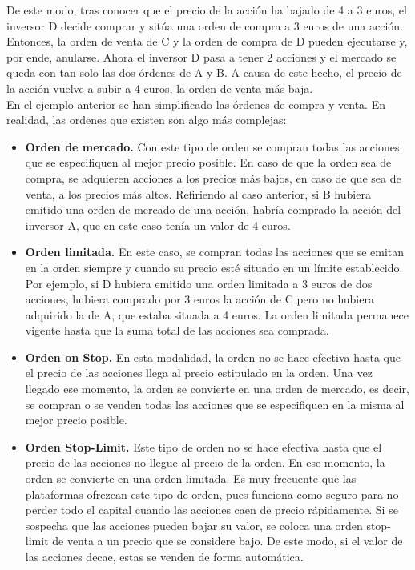 		
		De este modo, tras conocer que el precio de la acci\'on ha bajado de 4 a 3 euros, el inversor D decide comprar y sit\'ua una orden de compra a 3 euros de una acci\'on. Entonces, la orden de venta de C y la orden de compra de D pueden ejecutarse y, por ende, anularse. Ahora el inversor D pasa a tener 2 acciones y el mercado se queda con tan solo las dos \'ordenes de A y B. A causa de este hecho, el precio de la acci\'on vuelve a subir a 4 euros, la orden de venta m\'as baja.\\
		
		En el ejemplo anterior se han simplificado las \'ordenes de compra y venta. En realidad, las ordenes que existen son algo m\'as complejas:\\
		
		\begin{itemize}
			
			\item \textbf{Orden de mercado.} Con este tipo de orden se compran todas las acciones que se especifiquen al mejor precio posible. En caso de que la orden sea de compra, se adquieren acciones a los precios m\'as bajos, en caso de que sea de venta, a los precios m\'as altos. Refiriendo al caso anterior, si B hubiera emitido una orden de mercado de una acci\'on, habría comprado la acci\'on del inversor A, que en este caso ten\'ia un valor de 4 euros.
			
			\item \textbf{Orden limitada.} En este caso, se compran todas las acciones que se emitan en la orden siempre y cuando su precio est\'e situado en un l\'imite establecido. Por ejemplo, si D hubiera emitido una orden limitada a 3 euros de dos acciones, hubiera comprado por 3 euros la acci\'on de C pero no hubiera adquirido la de A, que estaba situada a 4 euros. La orden limitada permanece vigente hasta que la suma total de las acciones sea comprada.
			
			\item \textbf{Orden on Stop.} En esta modalidad, la orden no se hace efectiva hasta que el precio de las acciones llega al precio estipulado en la orden. Una vez llegado ese momento, la orden se convierte en una orden de mercado, es decir, se compran o se venden todas las acciones que se especifiquen en la misma al mejor precio posible.
			
			\item \textbf{Orden Stop-Limit.} Este tipo de orden no se hace efectiva hasta que el precio de las acciones no llegue al precio de la orden. En ese momento, la orden se convierte en una orden limitada. Es muy frecuente que las plataformas ofrezcan este tipo de orden, pues funciona como seguro para no perder todo el capital cuando las acciones caen de precio r\'apidamente. Si se sospecha que las acciones pueden bajar su valor, se coloca una orden stop-limit de venta a un precio que se considere bajo. De este modo, si el valor de las acciones decae, estas se venden de forma autom\'atica. 
			
		\end{itemize} 
		

